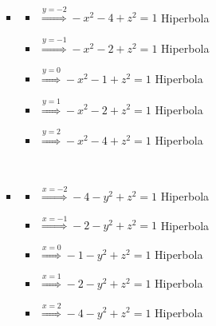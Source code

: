 \documentclass[../practica_02.tex]{subfiles}
\begin{document}
\begin{enumerate}
\begin{enumerate}
\begin{itemize}
                            $ $

                        \item
                            \begin{itemize}
                                \item $\stackrel{y=-2}{\Rightarrow} - x^2 - 4 + z^2 = 1 $ Hiperbola
                                \item $\stackrel{y=-1}{\Rightarrow} - x^2 - 2 + z^2 = 1 $ Hiperbola
                                \item $\stackrel{y=0}{\Rightarrow}  - x^2 - 1 + z^2 = 1 $ Hiperbola
                                \item $\stackrel{y=1}{\Rightarrow}  - x^2 - 2 + z^2 = 1 $ Hiperbola
                                \item $\stackrel{y=2}{\Rightarrow}  - x^2 - 4 + z^2 = 1 $ Hiperbola
                            \end{itemize}

                            $ $

                        \item
                            \begin{itemize}
                                \item $\stackrel{x=-2}{\Rightarrow} - 4 - y^2 + z^2 = 1 $ Hiperbola
                                \item $\stackrel{x=-1}{\Rightarrow} - 2 - y^2 + z^2 = 1 $ Hiperbola
                                \item $\stackrel{x=0}{\Rightarrow}  - 1 - y^2 + z^2 = 1 $ Hiperbola
                                \item $\stackrel{x=1}{\Rightarrow}  - 2 - y^2 + z^2 = 1 $ Hiperbola
                                \item $\stackrel{x=2}{\Rightarrow}  - 4 - y^2 + z^2 = 1 $ Hiperbola
                            \end{itemize}

                    \end{itemize}


\end{enumerate}
\end{enumerate}
\end{document}
